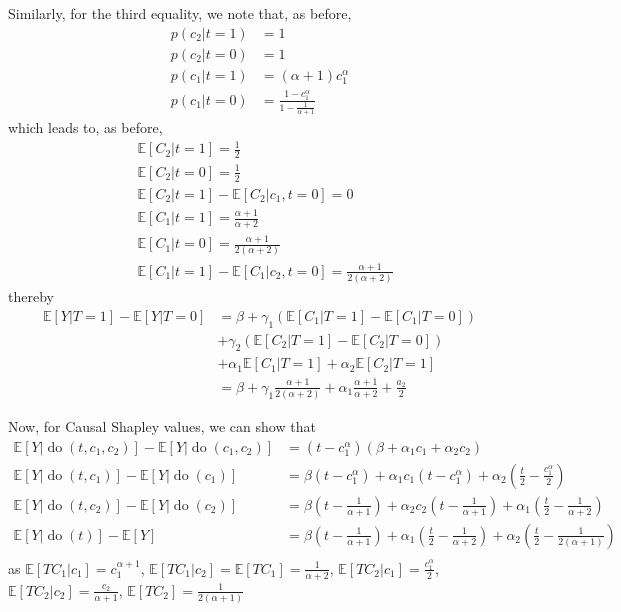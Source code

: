 \documentclass{article}
\theoremstyle{plain}
\theoremstyle{definition}
\theoremstyle{remark}
\newcommand{\Do}{\operatorname{do}}
\theoremstyle{mystyle}
\begin{document}
Similarly, for the third equality, we note that, as before,
\begin{align*}
    p(c_2|t=1) &= 1 \\
    p(c_2|t=0) &= 1 \\
    p(c_1|t=1) &= (\alpha+1)c_1^\alpha \\
    p(c_1|t=0) &= \frac{1 - c_1^\alpha}{1 - \frac{1}{\alpha+1}}
\end{align*}
which leads to, as before,
\begin{align*}
&\mathbb{E}[C_2|t=1] = \frac{1}{2} \\
&\mathbb{E}[C_2|t=0] = \frac{1}{2} \\
&\mathbb{E}[C_2|t=1] - \mathbb{E}[C_2|c_1,t=0] = 0 \\
&\mathbb{E}[C_1|t=1] = \frac{\alpha+1}{\alpha+2} \\
&\mathbb{E}[C_1|t=0] = \frac{\alpha+1}{2(\alpha+2)} \\
&\mathbb{E}[C_1|t=1] - \mathbb{E}[C_1|c_2,t=0] = \frac{\alpha+1}{2(\alpha+2)}
\end{align*}
thereby
\begin{align*}
    \mathbb{E}[Y|T=1] - \mathbb{E}[Y|T=0] &= \beta + \gamma_1 (\mathbb{E}[C_1|T=1] - \mathbb{E}[C_1|T=0] ) \\
    &+ \gamma_2(\mathbb{E}[C_2|T=1] - \mathbb{E}[C_2|T=0]) \\
    &+ \alpha_1\mathbb{E}[C_1|T=1] + \alpha_2\mathbb{E}[C_2|T=1]  \\
    &= \beta + \gamma_1\frac{\alpha + 1}{2(\alpha + 2)} + \alpha_1\frac{\alpha+1}{\alpha+2} + \frac{a_2}{2}
\end{align*}

Now, for Causal Shapley values, we can show that
\begin{align*}
    \mathbb{E}[Y|\Do(t,c_1,c_2)] - \mathbb{E}[Y|\Do(c_1,c_2)] &= (t - c_1^\alpha )(\beta + \alpha_1c_1 + \alpha_2c_2) \\
    \mathbb{E}[Y|\Do(t,c_1)] - \mathbb{E}[Y|\Do(c_1)] &= \beta (t - c_1^\alpha) + \alpha_1c_1(t - c_1^\alpha) + \alpha_2(\frac{t}{2} - \frac{c_1^\alpha}{2}) \\
    \mathbb{E}[Y|\Do(t,c_2)] - \mathbb{E}[Y|\Do(c_2)] &= \beta (t - \frac{1}{\alpha+1}) + \alpha_2c_2(t - \frac{1}{\alpha+1}) + \alpha_1(\frac{t}{2} - \frac{1}{\alpha+2}) \\
    \mathbb{E}[Y|\Do(t)] - \mathbb{E}[Y] &= \beta(t - \frac{1}{\alpha+1}) + \alpha_1(\frac{t}{2} - \frac{1}{\alpha+2}) + \alpha_2(\frac{t}{2} - \frac{1}{2(\alpha+1)}) \\
\end{align*}
as $\mathbb{E}[TC_1|c_1] = c_1^{\alpha+1}$, $\mathbb{E}[TC_1|c_2] = \mathbb{E}[TC_1] = \frac{1}{\alpha+2}$, $\mathbb{E}[TC_2|c_1] = \frac{c_1^\alpha}{2}$, $\mathbb{E}[TC_2|c_2] = \frac{c_2}{\alpha+1}$, $\mathbb{E}[TC_2] = \frac{1}{2(\alpha+1)}$
\end{document}
